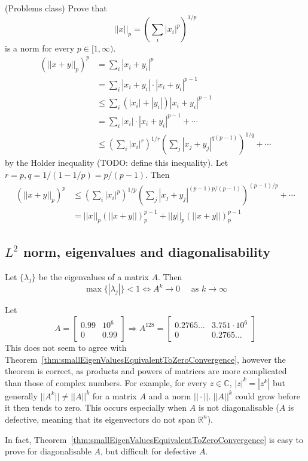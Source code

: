 \begin{example}
	(Problems class) Prove that
	\[
		||x||_p = {\left( \sum_i |x_i|^p \right)}^{1 / p}
	\]
	is a norm for every $p \in [1, \infty)$.
	\[
		\begin{aligned}
			{(||x + y||_p)}^p
				& = \sum_i |x_i + y_i|^p \\
				& = \sum_i |x_i + y_i| \cdot |x_i + y_i|^{p - 1} \\
				& \le \sum_i (|x_i| + |y_i|) |x_i + y_i|^{p - 1} \\
				& = \sum_i |x_i| \cdot |x_i + y_i|^{p - 1} + \cdots \\
				& \le {\left( \sum_i |x_i|^r \right)}^{1 / r} {\left( \sum_j |x_j + y_j|^{q (p - 1)} \right)}^{1 / q} + \cdots
		\end{aligned}
	\]
	by the Holder inequality (TODO: define this inequality). Let $r = p, q = 1/(1 - 1/p) = p / (p - 1)$. Then
	\[
		\begin{aligned}
			{(||x + y||_p)}^p
				& \le {\left( \sum_i |x_i|^p \right)}^{1 / p} {\left( \sum_j |x_j + y_j|^{(p - 1) p / (p - 1)} \right)}^{(p - 1) / p} + \cdots \\
				& = ||x||_p {(||x + y||)}_p^{p - 1} + ||y||_p {(||x + y||)}_p^{p - 1}
		\end{aligned}
	\]
\end{example}

\subsection{$L^2$ norm, eigenvalues and diagonalisability}

\begin{theorem}\label{thm:smallEigenValuesEquivalentToZeroConvergence}
	Let $\{ \lambda_j \}$ be the eigenvalues of a matrix $A$. Then
	\[
		\max \{ |\lambda_j| \} < 1 \Longleftrightarrow A^k \rightarrow 0 \quad \text{ as } k \rightarrow \infty
	\]
\end{theorem}

\begin{example}
	Let
	\[
		A = \begin{bmatrix}
			0.99 & 10^6 \\
			0 & 0.99
		\end{bmatrix}
		\Longrightarrow
		A^{128} = \begin{bmatrix}
			0.2765\dots & 3.751 \cdot 10^6 \\
			0 & 0.2765\dots
		\end{bmatrix}
	\]
	This does not seem to agree with Theorem~\ref{thm:smallEigenValuesEquivalentToZeroConvergence}, however the theorem is correct, as products and powers of matrices are more complicated than those of complex numbers. For example, for every $z \in \mathbb{C}$, $|z|^k = |z^k|$ but generally $||A^k|| \ne ||A||^k$ for a matrix $A$ and a norm $||\cdot||$. $||A||^k$ could grow before it then tends to zero. This occurs especially when $A$ is not diagonalisable ($A$ is defective, meaning that its eigenvectors do not span $\mathbb{R}^n$).

	In fact, Theorem~\ref{thm:smallEigenValuesEquivalentToZeroConvergence} is easy to prove for diagonalisable $A$, but difficult for defective $A$.
\end{example}

